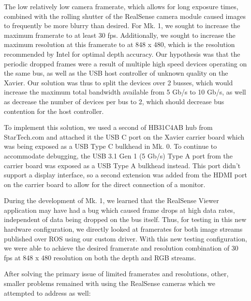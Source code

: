 The low relatively low camera framerate, which allows for long exposure times, combined with the rolling shutter of the RealSense camera module caused images to frequently be more blurry than desired. For Mk. 1, we sought to increase the maximum framerate to at least 30 fps. Additionally, we sought to increase the maximum resolution at this framerate to at 848 x 480, which is the resolution recommended by Intel for optimal depth accuracy. Our hypothesis was that the periodic dropped frames were a result of multiple high speed devices operating on the same bus, as well as the USB host controller of unknown quality on the Xavier. Our solution was thus to split the devices over 2 busses, which would increase the maximum total bandwidth available from 5 Gb/s to 10 Gb/s, as well as decrease the number of devices per bus to 2, which should decrease bus contention for the host controller.

To implement this solution, we used a second of HB31C4AB hub from StarTech.com and attached it the USB C port on the Xavier carrier board which was being exposed as a USB Type C bulkhead in Mk. 0. To continue to accommodate debugging, the USB 3.1 Gen 1 (5 Gb/s) Type A port from the carrier board was exposed as a USB Type A bulkhead instead. This port didn't support a display interface, so a second extension was added from the HDMI port on the carrier board to allow for the direct connection of a monitor.

During the development of Mk. 1, we learned that the RealSense Viewer application may have had a bug which caused frame drops at high data rates, independent of data being dropped on the bus itself. Thus, for testing in this new hardware configuration, we directly looked at framerates for both image streams published over ROS using our custom driver. With this new testing configuration, we were able to achieve the desired framerate and resolution combination of 30 fps at 848 x 480 resolution on both the depth and RGB streams.

After solving the primary issue of limited framerates and resolutions, other, smaller problems remained with using the RealSense cameras which we attempted to address as well:

